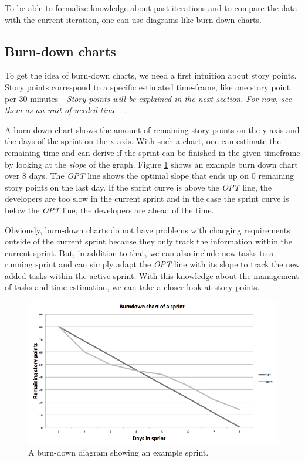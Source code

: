 To be able to formalize knowledge about past iterations and to compare the data with the current iteration, one can use diagrams like burn-down charts.

\subsection{Burn-down charts}
To get the idea of burn-down charts, we need a first intuition about story points. Story points correspond to a specific estimated time-frame, like one story point per 30 minutes \emph{- Story points will be explained in the next section. For now, see them as an unit of needed time - }.

A burn-down chart shows the amount of remaining story points on the y-axis and the days of the sprint on the x-axis. With such a chart, one can estimate the remaining time and can derive if the sprint can be finished in the given timeframe by looking at the \textit{slope} of the graph. Figure \ref{Burndown example} shows an example burn down chart over 8 days. The \emph{OPT} line shows the optimal slope that ends up on 0 remaining story points on the last day. If the sprint curve is above the \emph{OPT} line, the developers are too slow in the current sprint and in the case the sprint curve is below the \emph{OPT} line, the developers are ahead of the time. 

Obviously, burn-down charts do not have problems with changing requirements outside of the current sprint because they only track the information within the current sprint. 
But, in addition to that, we can also include new tasks to a running sprint and can simply adapt the \emph{OPT} line with its slope to track the new added tasks within the active sprint. With this knowledge about the management of tasks and time estimation, we can take a closer look at story points.

\begin{figure}[th]
\centerline{\includegraphics[width=1\textwidth]{gfx/burndown}}
\caption{A burn-down diagram showing an example sprint.}
\label{Burndown example}
\end{figure}

